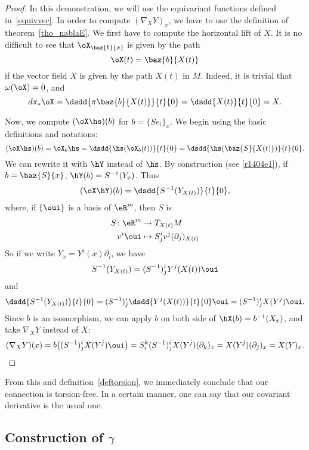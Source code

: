 \begin{proof}
	In this demonstration, we will use the equivariant functions defined in~\ref{equivvec}. In order to compute $(\nabla_XY)_x$, we have to use the definition of theorem~\ref{tho_nablaE}. We first have to compute the horizontal lift of $X$. It is no difficult to see that $\oX_{\baz{b}{x}}$ is given by the path
	\[\oX(t)=\baz{b}{X(t)}\]
	if the vector field $X$ is given by the path $X(t)$ in $M$. Indeed, it is trivial that $\omega(\oX)=0$, and
	\[d\pi_*\oX=\dsdd{\pi\baz{b}{X(t)}}{t}{0}=\dsdd{X(t)}{t}{0}=X.\]

	Now, we compute $(\oX\hs)(b)$ for $b=\{Se_i\}_x$. We begin using the basic definitions and notations:
	\[
		(\oX\hs)(b)=\oX_b\hs=\dsdd{\hs(\oX_b(t))}{t}{0}=\dsdd{\hs(\baz{S}{X(t)})}{t}{0}.
	\]
	We can rewrite it with $\hY$ instead of $\hs$. By construction (see \eqref{r1404e1}), if $b=\baz{S}{x}$, $\hY(b)=S^{-1}(Y_x)$. Thus
	\[
		(\oX\hY)(b)=\dsdd{S^{-1}(Y_{X(t)})}{t}{0},
	\]
	where, if $\{\oui\}$ is a basis of $\eR^m$, then $S$ is
	\begin{equation}
		\begin{aligned}
			S\colon\eR^m & \to T_{X(t)}M                       \\
			v^i\oui      & \mapsto S^i_jv^j(\partial_j)_{X(t)}
		\end{aligned}
	\end{equation}
	So if we write $Y_x=Y^i(x)\partial_i$, we have
	\[
		S^{-1}(Y_{X(t)})=(S^{-1})^i_jY^j(X(t))\oui
	\]
	and
	\[
		\dsdd{S^{-1}(Y_{X(t)})}{t}{0}=(S^{-1})^i_j\dsdd{Y^j(X(t))}{t}{0}\oui=(S^{-1})^i_jX(Y^j)\oui.
	\]
	Since $b$ is an isomorphism, we can apply $b$ on both side of $\hX(b)=b^{-1}(X_x)$, and take $\nabla_XY$ instead of $X$:
	\begin{equation}
		(\nabla_XY)(x)=b\big((S^{-1})^i_jX(Y^j)\oui\big)
		=S^k_i(S^{-1})^i_jX(Y^j)(\partial_k)_x
		=X(Y^j)(\partial_j)_x
		=X(Y)_x.
	\end{equation}
\end{proof}

From this and definition~\ref{deftorsion}, we immediately conclude that our connection is torsion-free. In a certain manner, one can say that our covariant derivative is the usual one.

\subsection{Construction of \texorpdfstring{$\gamma$}{g}}

